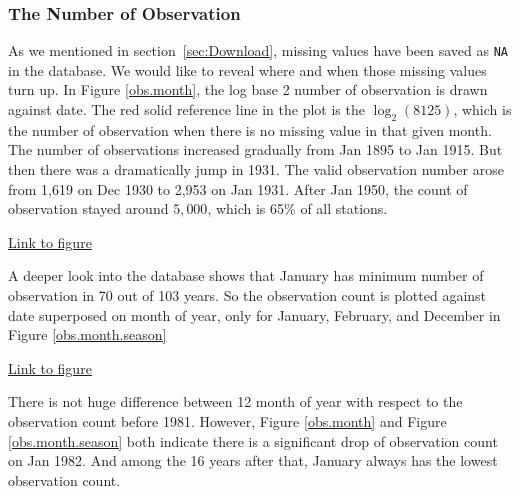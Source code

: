 \subsubsection{The Number of Observation}

As we mentioned in section~\ref{sec:Download}, missing values have been saved as 
\texttt{NA} in the database. We would like to reveal where and when those 
missing values turn up.
In Figure \href{../plots/obs_month.pdf}{\ref*{obs.month}}, the log base 2 number
of observation is drawn against date. The red solid reference line in the plot is 
the $\log_2(8125)$, which is the number of observation when there is no missing 
value in that given month. The number of observations increased gradually from 
Jan 1895 to Jan 1915. But then there was a dramatically jump in 1931. The valid
observation number arose from 1,619 on Dec 1930 to 2,953 on Jan 1931. After Jan 
1950, the count of observation stayed around $5,000$, which is 65\% of all
stations. 

\begin{framed}
\begin{center}
  \href{../plots/obs_month.pdf}{Link to figure}
  \label{obs.month}
\end{center}
\end{framed}

A deeper look into the database shows that January has minimum number of 
observation in 70 out of 103 years. So the observation count is plotted against
date superposed on month of year, only for January, February, and December in 
Figure \href{../plots/obs_month_byseason.pdf}{\ref*{obs.month.season}}

\begin{framed}
\begin{center}
  \href{../plots/obs_month_byseason.pdf}{Link to figure}
  \label{obs.month.season}
\end{center}
\end{framed}

There is not huge difference between 12 month of year with respect to the 
observation count before 1981. However, Figure 
\href{../plots/obs_month.pdf}{\ref*{obs.month}} and 
Figure \href{../plots/obs_month_byseason.pdf}{\ref*{obs.month.season}} both 
indicate there is a significant drop of observation count on Jan 1982. And among 
the 16 years after that, January always has the lowest observation count.

